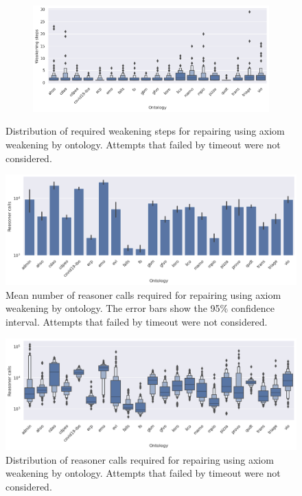 \begin{figure}[ht]
\begin{widepage}
\begin{subfigure}[T]{0.77\textwidth}
      \includegraphics[width=\textwidth]{resources/steps-ontology-violin-2.png}
    \end{subfigure}
  \end{widepage}
  \caption{Distribution of required weakening steps for repairing using axiom weakening by ontology. Attempts that failed by timeout were not considered.}
\end{figure}

\begin{figure}[ht]
  \begin{widepage}
    \centering
    \includegraphics[width=\textwidth]{resources/calls-ontology-bar.png}
  \end{widepage}
  \caption{Mean number of reasoner calls required for repairing using axiom weakening by ontology. The error bars show the 95\% confidence interval. Attempts that failed by timeout were not considered.}
\end{figure}

\begin{figure}[ht]
  \begin{widepage}
    \centering
    \includegraphics[width=\textwidth]{resources/calls-ontology-violin.png}
  \end{widepage}
  \caption{Distribution of reasoner calls required for repairing using axiom weakening by ontology. Attempts that failed by timeout were not considered.}
\end{figure}

